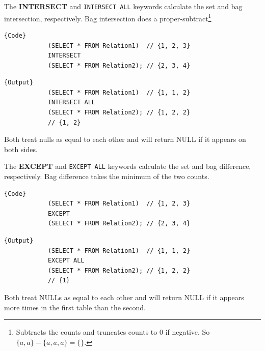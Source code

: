 \documentclass{article}
\begin{document}
      \begin{definition}[Intersection]
        The \textbf{INTERSECT} and \texttt{INTERSECT ALL} keywords calculate the set and bag intersection, respectively. Bag intersection does a proper-subtract\footnote{Subtracts the counts and truncates counts to $0$ if negative. So $\{a, a\} - \{a, a, a\} = \{\}$.} 

        \noindent\begin{minipage}{.5\textwidth}
          \begin{lstlisting}[]{Code}
            (SELECT * FROM Relation1)  // {1, 2, 3}
            INTERSECT 
            (SELECT * FROM Relation2); // {2, 3, 4}
          \end{lstlisting}
          \end{minipage}
          \hfill
          \begin{minipage}{.49\textwidth}
          \begin{lstlisting}[]{Output}
            (SELECT * FROM Relation1)  // {1, 1, 2}
            INTERSECT ALL 
            (SELECT * FROM Relation2); // {1, 2, 2}
            // {1, 2}
          \end{lstlisting}
        \end{minipage}
        Both treat nulls as equal to each other and will return NULL if it appears on both sides. 
      \end{definition}

      \begin{definition}[Difference]
        The \textbf{EXCEPT} and \texttt{EXCEPT ALL} keywords calculate the set and bag difference, respectively. Bag difference takes the minimum of the two counts. 

        \noindent\begin{minipage}{.5\textwidth}
          \begin{lstlisting}[]{Code}
            (SELECT * FROM Relation1)  // {1, 2, 3}
            EXCEPT 
            (SELECT * FROM Relation2); // {2, 3, 4}
          \end{lstlisting}
          \end{minipage}
          \hfill
          \begin{minipage}{.49\textwidth}
          \begin{lstlisting}[]{Output}
            (SELECT * FROM Relation1)  // {1, 1, 2}
            EXCEPT ALL 
            (SELECT * FROM Relation2); // {1, 2, 2}
            // {1}
          \end{lstlisting}
        \end{minipage}
        Both treat NULLs as equal to each other and will return NULL if it appears more times in the first table than the second. 
      \end{definition}
\end{document}
